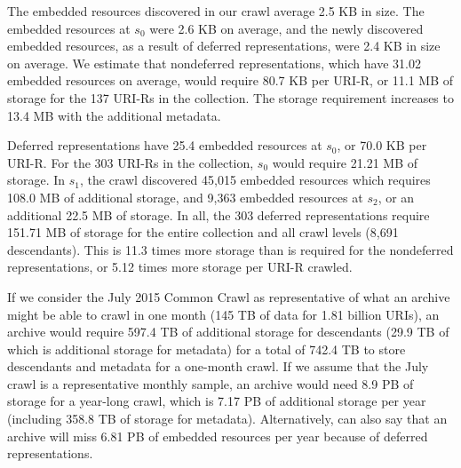 \documentclass{sig-alternate}
\begin{document}
The embedded resources discovered in our crawl average 2.5 KB in size. The embedded resources at $s_0$ were 2.6 KB on average, and the newly discovered embedded resources, as a result of deferred representations, were 2.4 KB in size on average. We estimate that nondeferred representations, which have 31.02 embedded resources on average, would require 80.7 KB per URI-R, or 11.1 MB of storage for the 137 URI-Rs in the collection. The storage requirement increases to 13.4 MB with the additional metadata.

Deferred representations have 25.4 embedded resources at $s_0$, or 70.0 KB per URI-R. For the 303 URI-Rs in the collection, $s_0$ would require 21.21 MB of storage. In $s_1$, the crawl discovered 45,015 embedded resources which requires 108.0 MB of additional storage, and 9,363 embedded resources at $s_2$, or an additional 22.5 MB of storage. In all, the 303 deferred representations require 151.71 MB of storage for the entire collection and all crawl levels (8,691 descendants). This is 11.3 times more storage than is required for the nondeferred representations, or 5.12 times more storage per URI-R crawled. 

If we consider the July 2015 Common Crawl \cite{iaSize} as representative of what an archive might be able to crawl in one month (145 TB of data for 1.81 billion URIs), an archive would require 597.4 TB of additional storage for descendants (29.9 TB of which is additional storage for metadata) for a total of 742.4 TB to store descendants and metadata for a one-month crawl. If we assume that the July crawl is a representative monthly sample, an archive would need 8.9 PB of storage for a year-long crawl, which is 7.17 PB of additional storage per year (including 358.8 TB of storage for metadata). Alternatively, can also say that an archive will miss 6.81 PB of embedded resources per year because of deferred representations.
\end{document}
